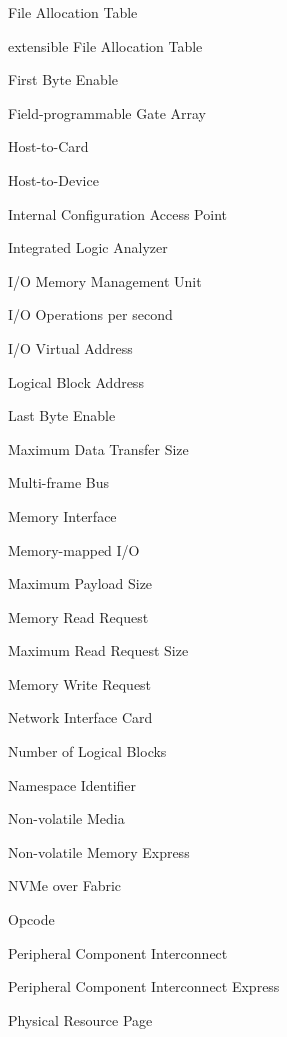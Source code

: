 \begin{acronym}[SQTDBLL]
    {File Allocation Table}

    {extensible File Allocation Table}

    {First Byte Enable}

    {Field-programmable Gate Array}

    {Host-to-Card}

    {Host-to-Device}

    {Internal Configuration Access Point}

    {Integrated Logic Analyzer}

    {I/O Memory Management Unit}

    {I/O Operations per second}

    {I/O Virtual Address}

    {Logical Block Address}

    {Last Byte Enable}

    {Maximum Data Transfer Size}

    {Multi-frame Bus}

    {Memory Interface}

    {Memory-mapped I/O}

    {Maximum Payload Size}

    {Memory Read Request}

    {Maximum Read Request Size}

    {Memory Write Request}

    {Network Interface Card}

    {Number of Logical Blocks}

    {Namespace Identifier}

    {Non-volatile Media}

    {Non-volatile Memory Express}

    {NVMe over Fabric}

    {Opcode}

    {Peripheral Component Interconnect}

    {Peripheral Component Interconnect Express}

    {Physical Resource Page}


\end{acronym}
